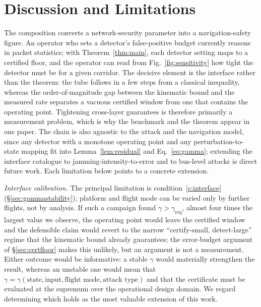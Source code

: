 \begin{table}[t]
\centering
\caption{Acquisition provenance across the ingested corpus. Counts come from
the schema-validated adapter outputs, and the split is machine-generated by
 so the paper cannot drift from the
artifact. Acquisition is a property of the source; the strictly stronger
 distribution is discussed in the text.}
\label{tab:provenance}
\footnotesize
\renewcommand{\arraystretch}{1.05}

\end{table}

\section{Discussion and Limitations}
\label{sec:discussion}
\label{sec:limitations}
The composition converts a network-security parameter into a navigation-safety
figure. An operator who sets a detector's false-positive budget currently
reasons in packet statistics; with Theorem~\ref{thm:main}, each detector
setting maps to a certified floor, and the operator can read from
Fig.~\ref{fig:sensitivity} how tight the detector must be for a given corridor.
The decisive element is the interface rather than the theorem: the tube follows
in a few steps from a classical inequality, whereas the order-of-magnitude gap
between the kinematic bound and the measured rate separates a vacuous certified
window from one that contains the operating point. Tightening cross-layer
guarantees is therefore primarily a measurement problem, which is why the
benchmark and the theorem appear in one paper. The chain is also agnostic to
the attack and the navigation model, since any detector with a monotone
operating point and any perturbation-to-state mapping fit into
Lemma~\ref{lem:residual} and Eq.~\eqref{eq:gamma}; extending the interface
catalogue to jamming-intensity-to-error and to bus-level attacks is direct
future work. Each limitation below points to a concrete extension.

\emph{Interface calibration.} The principal limitation is
condition~\ref{c:interface} (\S\ref{sec:gammastability}); platform and flight
mode can be varied only by further flights, not by analysis. If such a campaign
found $\gamma>\gamma_{\mathrm{req}}$, almost four times the largest value we
observe, the operating point would leave the certified window and the
defensible claim would revert to the narrow ``certify-small, detect-large''
regime that the kinematic bound already guarantees; the error-budget argument
of \S\ref{sec:certfloor} makes this unlikely, but an argument is not a
measurement. Either outcome would be informative: a stable
$\gamma$ would materially strengthen the result, whereas an unstable one would
mean that $\gamma=\gamma(\text{state},\text{input},\text{flight
mode},\text{attack type})$ and that the certificate must be evaluated at the
supremum over the operational design domain. We regard determining which holds
as the most valuable extension of this work.

